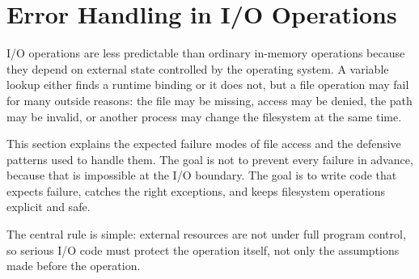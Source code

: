 \section{Error Handling in I/O Operations}

I/O operations are less predictable than ordinary in-memory operations because they depend on external state controlled by the operating system. A variable lookup either finds a runtime binding or it does not, but a file operation may fail for many outside reasons: the file may be missing, access may be denied, the path may be invalid, or another process may change the filesystem at the same time.

This section explains the expected failure modes of file access and the defensive patterns used to handle them. The goal is not to prevent every failure in advance, because that is impossible at the I/O boundary. The goal is to write code that expects failure, catches the right exceptions, and keeps filesystem operations explicit and safe.

The central rule is simple: external resources are not under full program control, so serious I/O code must protect the operation itself, not only the assumptions made before the operation.